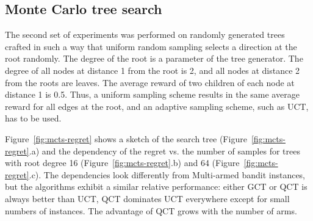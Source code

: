 \documentclass{article}
\begin{document}
\subsection{Monte Carlo tree search}
\label{seq:emp-mcts}

The second set of experiments was performed on randomly generated
trees crafted in such a way that uniform random sampling selects a
direction at the root randomly. The degree of the root is a parameter of
the tree generator. The degree of all nodes at distance 1 from the
root is 2, and all nodes at distance 2 from the roots are leaves. The
average reward of two children of each node at distance 1 is
0.5. Thus, a uniform sampling scheme results in the same average reward for
all edges at the root, and an adaptive sampling scheme, such as UCT,
has to be used.

Figure~\ref{fig:mcts-regret} shows a sketch of the search tree
(Figure~\ref{fig:mcts-regret}.a) and the dependency of the regret vs. the
number of samples for trees with root degree 16
(Figure~\ref{fig:mcts-regret}.b) and 64 (Figure~\ref{fig:mcts-regret}.c). The
dependencies look differently from Multi-armed bandit instances, but
the algorithms exhibit a similar relative performance: either GCT or QCT
is always better than UCT, QCT dominates UCT everywhere
except for small numbers of instances. The advantage of QCT grows with
the number of arms.
\end{document}
